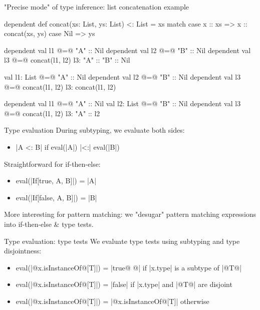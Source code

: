 \documentclass[10pt]{beamer}
\newenvironment{slide}[2][]
  {\begin{frame}[fragile,environment=slide,#1]{#2}}
  {\end{frame}}
\newcommand{\tp}[1]{\color{typeColor}#1}
\begin{document}
\begin{slide}{"Precise mode" of type inference: list concatenation example}
\begin{code}
dependent def concat(xs: List, ys: List) <: List =
  xs match
    case x :: xs => x :: concat(xs, ys)
    case Nil => ys
\end{code}

\begin{overprint}
\begin{code}
dependent val l1 @=@ "A" :: Nil
dependent val l2 @=@ "B" :: Nil
dependent val l3 @=@ concat(l1, l2)
l3: { "A" :: "B" :: Nil }
\end{code}

\begin{code}
val l1: List     @=@ "A" :: Nil
dependent val l2 @=@ "B" :: Nil
dependent val l3 @=@ concat(l1, l2)
l3: { concat(l1, l2) }
\end{code}

\begin{code}
dependent val l1 @=@ "A" :: Nil
val l2: List     @=@ "B" :: Nil
dependent val l3 @=@ concat(l1, l2)
l3: { "A" :: l2 }
\end{code}

\end{overprint}
\end{slide}

\begin{slide}{Type evaluation}
During subtyping, we evaluate both sides:
\begin{itemize}
  \item |A <: B|  \quad if \quad eval(|A|) |<:| eval(|B|)
\end{itemize}
\pause

Straightforward for if-then-else:
\begin{itemize}
  \item eval(|If[true, A, B]|) = |A|
  \item eval(|If[false, A, B]|) = |B|
\end{itemize}
\pause

More interesting for pattern matching: we "desugar" pattern matching expressions into if-then-else \& type tests.
\end{slide}
\begin{slide}{Type evaluation: type tests}
We evaluate type tests using subtyping and type disjointness:
\begin{itemize}
  \item eval(|@\tp{x.isInstanceOf}@[T]|) = |true@ @| \quad if |x.type| is a subtype of |@\tp{T}@|
  \item eval(|@\tp{x.isInstanceOf}@[T]|) = |false| \quad if |x.type| and |@\tp{T}@| are disjoint
  \item eval(|@\tp{x.isInstanceOf}@[T]|) = |@\tp{x.isInstanceOf}@[T]| \quad otherwise
\end{itemize}
\end{slide}
\end{document}
